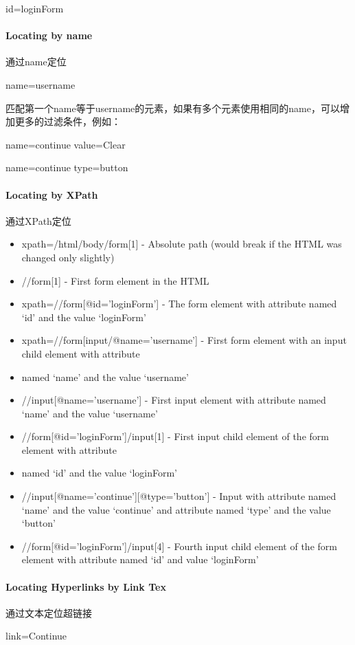 id=loginForm

\paragraph{Locating by name} 通过name定位

name=username

匹配第一个name等于username的元素，如果有多个元素使用相同的name，可以增加更多的过滤条件，例如：

name=continue value=Clear

name=continue type=button

\paragraph{Locating by XPath} 通过XPath定位
\begin{itemize}
\item xpath=/html/body/form[1] - Absolute path (would break if the HTML was changed only slightly)
\item //form[1] - First form element in the HTML
\item xpath=//form[@id='loginForm'] - The form element with attribute named ‘id’ and the value ‘loginForm’
\item xpath=//form[input/@name='username'] - First form element with an input child element with attribute \item named ‘name’ and the value ‘username’
\item //input[@name='username'] - First input element with attribute named ‘name’ and the value ‘username’
\item //form[@id='loginForm']/input[1] - First input child element of the form element with attribute \item named ‘id’ and the value ‘loginForm’
\item //input[@name='continue'][@type='button'] - Input with attribute named ‘name’ and the value ‘continue’ and attribute named ‘type’ and the value ‘button’
\item  //form[@id='loginForm']/input[4] - Fourth input child element of the form element with attribute named ‘id’ and value ‘loginForm’
\end{itemize}

\paragraph{Locating Hyperlinks by Link Tex} 通过文本定位超链接

link=Continue

